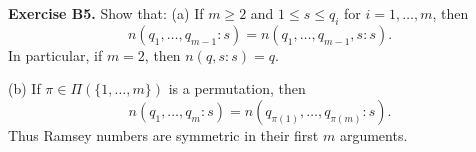 \textbf{Exercise B5.}
Show that:
(a) If $m \geq 2$ and $1 \leq s \leq q_i$ for $i = 1,\ldots,m$, then
$$n(q_1, \ldots, q_{m-1} : s) = n(q_1, \ldots, q_{m-1}, s : s).$$
In particular, if $m = 2$, then $n(q, s : s) = q$.

(b) If $\pi \in \Pi(\{1, \ldots, m\})$ is a permutation, then
$$n(q_1, \ldots, q_m : s) = n(q_{\pi(1)}, \ldots, q_{\pi(m)} : s).$$
Thus Ramsey numbers are symmetric in their first $m$ arguments.
